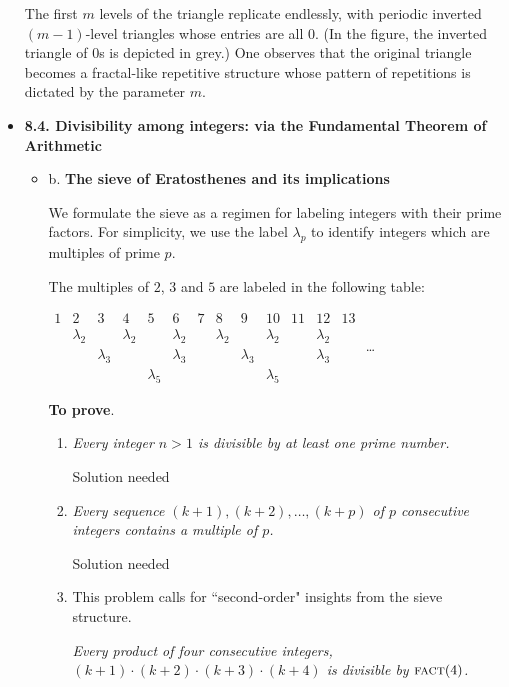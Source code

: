 \begin{itemize}
The first $m$ levels of the triangle replicate endlessly, with periodic inverted $(m-1)$-level triangles whose entries are all $0$.  (In the figure, the inverted triangle of $0$s is depicted in grey.)   One observes that the original triangle becomes a fractal-like repetitive structure whose pattern of repetitions is dictated by the parameter $m$.

%
\medskip\item
{\bf 8.4. Divisibility among integers: via the Fundamental Theorem of Arithmetic}

  \begin{itemize}
\item
b. {\bf The sieve of Eratosthenes and its implications}

We formulate the sieve as a regimen for labeling integers with their prime factors.  For simplicity, we use the label $\lambda_p$ to identify integers which are multiples of prime $p$.

\medskip

The multiples of $2$, $3$ and $5$ are labeled in the following table:

$\begin{array}{c|c|c|c|c|c|c|c|c|c|c|c|c}
1 & 2 & 3 & 4 & 5 & 6 & 7 & 8 & 9 & 10 & 11 & 12 & 13 \\
 & \lambda_2 & & \lambda_2 & & \lambda_2 & & \lambda_2 & & \lambda_2 & & \lambda_2 & \\
 & & \lambda_3 & &  & \lambda_3 & & & \lambda_3 & & & \lambda_3 & \\
 & & & & \lambda_5 & & & & & \lambda_5 & & & 
\end{array}$ \ldots

\bigskip

{\bf To prove}.
     \begin{enumerate}
     \item
{\em Every integer $n>1$ is divisible by at least one prime number.}

{\Arny Solution needed}
     \medskip\item
{\em Every sequence $(k+1), (k+2), \ldots, (k+p)$ of $p$ consecutive integers contains a multiple of $p$.}

{\Arny Solution needed}

      \medskip\item 
This problem calls for ``second-order" insights from the sieve structure.

\smallskip

{\em Every product of four consecutive integers, $(k+1) \cdot (k+2) \cdot (k+3) \cdot (k+4)$ is divisible by $\mbox{\sc fact}(4)$.}


\end{enumerate}
\end{itemize}
\end{itemize}
